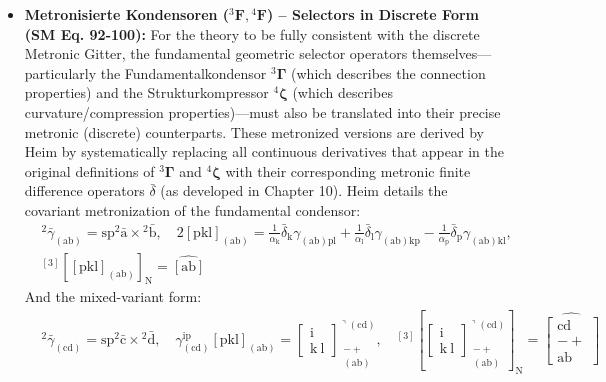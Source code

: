 \documentclass[12pt]{article}
\newcommand{\fundamentalkondensor}{{}^3\bm{\Gamma}}
\newcommand{\strukturkompressor}{{}^4\bm{\zeta}}
\newcommand{\metronisiertekondensor}[1]{{}^{#1}\mathbf{F}}
\begin{document}
\begin{itemize}
    \item \textbf{Metronisierte Kondensoren (\( \metronisiertekondensor{3}, \metronisiertekondensor{4} \)) – Selectors in Discrete Form (SM Eq. 92-100):}
    For the theory to be fully consistent with the discrete Metronic Gitter, the fundamental geometric selector operators themselves—particularly the Fundamentalkondensor \( \fundamentalkondensor \) (which describes the connection properties) and the Strukturkompressor \( \strukturkompressor \) (which describes curvature/compression properties)—must also be translated into their precise metronic (discrete) counterparts. These metronized versions are derived by Heim by systematically replacing all continuous derivatives that appear in the original definitions of \( \fundamentalkondensor \) and \( \strukturkompressor \) with their corresponding metronic finite difference operators \( \bar{\delta} \) (as developed in Chapter 10). 
    Heim details the covariant metronization of the fundamental condensor:
    \begin{equation}
    \begin{aligned}
    & {}^2\bar{\gamma}_{(\mathrm{ab})} = \mathrm{sp}{}^2\bar{\mathrm{a}} \times {}^2\bar{\mathrm{b}}, \quad 2\left[\mathrm{pkl}\right]_{(\mathrm{ab})} = \frac{1}{\alpha_\mathrm{k}} \bar{\delta}_\mathrm{k} \gamma_{(\mathrm{ab})\mathrm{pl}} + \frac{1}{\alpha_\mathrm{l}} \bar{\delta}_\mathrm{l} \gamma_{(\mathrm{ab})\mathrm{kp}} - \frac{1}{\alpha_\mathrm{p}} \bar{\delta}_\mathrm{p} \gamma_{(\mathrm{ab})\mathrm{kl}}, \\
    & {}^{[3]}\left[ \left[ \mathrm{pkl} \right]_{(\mathrm{ab})} \right]_\mathrm{N} = \widehat{[\mathrm{ab}]}
    \end{aligned} \tag{92}
    \end{equation}
    And the mixed-variant form:
    \begin{equation}
    \begin{aligned}
    & {}^2\bar{\gamma}_{(\mathrm{cd})} = \mathrm{sp}{}^2\bar{\mathrm{c}} \times {}^2\bar{\mathrm{d}}, \quad \gamma^{\mathrm{ip}}_{(\mathrm{cd})} \left[ \mathrm{pkl} \right]_{(\mathrm{ab})} = \left[ \begin{matrix} \mathrm{i} \\ \mathrm{k\ l} \end{matrix} \right]^{\urcorner(\mathrm{cd})}_{\substack{- + \\ (\mathrm{ab})}}, \quad {}^{[3]}\left[ \left[ \begin{matrix} \mathrm{i} \\ \mathrm{k\ l} \end{matrix} \right]^{\urcorner(\mathrm{cd})}_{\substack{- + \\ (\mathrm{ab})}} \right]_\mathrm{N} = \widehat{\left[ \begin{matrix} \mathrm{cd} \\ - + \\ \mathrm{ab} \end{matrix} \right]}

\end{aligned}
\end{equation}
\end{itemize}
\end{document}
